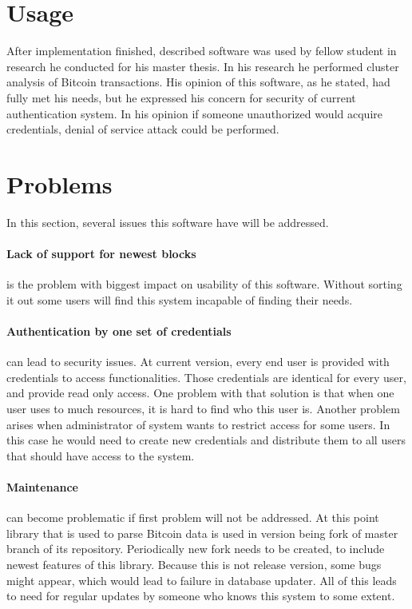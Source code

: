 \documentclass[12pt, en, eng, oneside]{mgr}
\begin{document}
\section{Usage}
After implementation finished, described software was used by fellow student in research he conducted for his master thesis. In his research he performed cluster analysis of Bitcoin transactions. His opinion of this software, as he stated, had fully met his needs, but he expressed his concern for security of current authentication system. In his opinion if someone unauthorized would acquire credentials, denial of service attack could be performed.

\section{Problems}
In this section, several issues this software have will be addressed.

\paragraph{Lack of support for newest blocks} is the problem with biggest impact on usability of this software. Without sorting it out some users will find this system incapable of finding their needs. 

\paragraph{Authentication by one set of credentials} can lead to security issues. At current version, every end user is provided with credentials to access functionalities. Those credentials are identical for every user, and provide read only access. One problem with that solution is that when one user uses to much resources, it is hard to find who this user is. Another problem arises when administrator of system wants to restrict access for some users. In this case he would need to create new credentials and distribute them to all users that should have access to the system.

\paragraph{Maintenance} can become problematic if first problem will not be addressed. At this point library that is used to parse Bitcoin data is used in version being fork of master branch of its repository. Periodically new fork needs to be created, to include newest features of this library. Because this is not release version, some bugs might appear, which would lead to failure in database updater. All of this leads to need for regular updates by someone who knows this system to some extent. 
\end{document}
